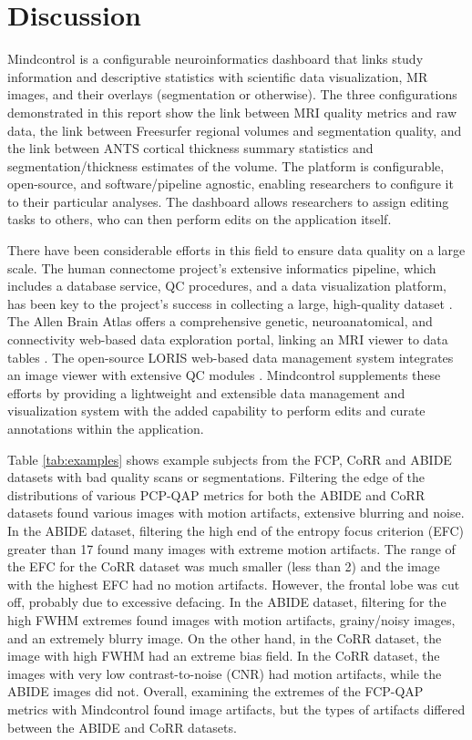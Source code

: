 \section{Discussion}

Mindcontrol is a configurable neuroinformatics dashboard that links study information and descriptive statistics with scientific data visualization, MR images, and their overlays (segmentation or otherwise). The three configurations demonstrated in this report show the link between MRI quality metrics and raw data, the link between Freesurfer regional volumes and segmentation quality, and the link between ANTS cortical thickness summary statistics and segmentation/thickness estimates of the volume. The platform is configurable, open-source, and software/pipeline agnostic, enabling researchers to configure it to their particular analyses. The dashboard allows researchers to assign editing tasks to others, who can then perform edits on the application itself. 

There have been considerable efforts in this field to ensure data quality on a large scale. The human connectome project's extensive informatics pipeline, which includes a database service, QC procedures, and a data visualization platform, has been key to the project's success in collecting a large, high-quality dataset \cite{Marcus_2013}. The Allen Brain Atlas offers a comprehensive genetic, neuroanatomical, and connectivity web-based data exploration portal, linking an MRI viewer to data tables \cite{Sunkin_2012}. The open-source LORIS web-based data management system integrates an image viewer with extensive QC modules \cite{Das_2012}. Mindcontrol supplements these efforts by providing a lightweight and extensible data management and visualization system with the added capability to perform edits and curate annotations within the application. 

Table \ref{tab:examples} shows example subjects from the FCP, CoRR and ABIDE datasets with bad quality scans or segmentations. Filtering the edge of the distributions of various PCP-QAP metrics for both the ABIDE and CoRR datasets found various images with motion artifacts, extensive blurring and noise. In the ABIDE dataset, filtering the high end of the entropy focus criterion (EFC) greater than 17 found many images with extreme motion artifacts. The range of the EFC for the CoRR dataset was much smaller (less than 2) and the image with the highest EFC had no motion artifacts. However, the frontal lobe was cut off, probably due to excessive defacing. In the ABIDE dataset, filtering for the high FWHM extremes found images with motion artifacts, grainy/noisy images, and an extremely blurry image. On the other hand, in the CoRR dataset, the image with high FWHM had an extreme bias field. In the CoRR dataset, the images with very low contrast-to-noise (CNR) had motion artifacts, while the ABIDE images did not. Overall, examining the extremes of the FCP-QAP metrics with Mindcontrol found image artifacts, but the types of artifacts differed between the ABIDE and CoRR datasets. 


